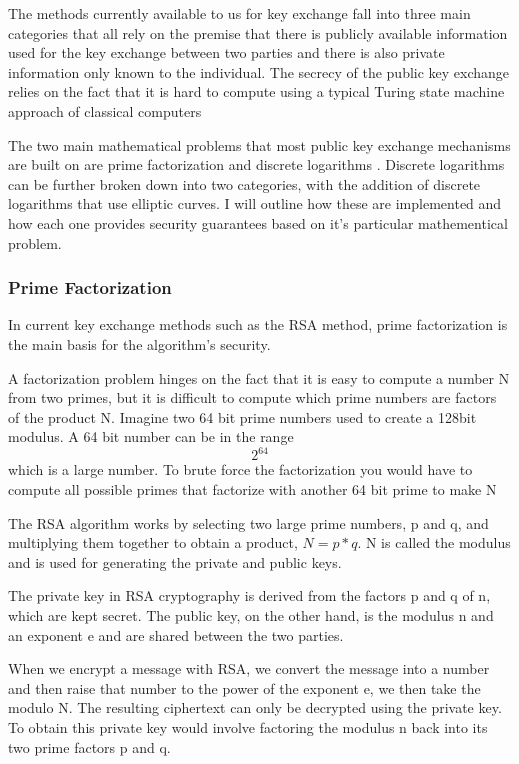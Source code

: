 \documentclass{article}
\begin{document}
The methods currently available to us for key exchange fall into three main categories that all rely on the premise that there is publicly available information used for the key exchange between two parties and there is also private information only known to the individual. The secrecy of the public key exchange relies on the fact  that it is hard to compute using a typical Turing state machine approach of classical computers 

The two main mathematical problems that most public key exchange mechanisms are built on are prime factorization and discrete logarithms \cite{AndersonR2020}. Discrete logarithms can be further broken down into two categories, with the addition of discrete logarithms that use elliptic curves. I will outline how these are implemented and how each one provides security guarantees based on it's particular mathementical problem.

\subsubsection{Prime Factorization}

In current key exchange methods such as the RSA method, prime factorization is the main basis for the algorithm's security. 

A factorization problem hinges on the fact that it is easy to compute a number N from two primes, but it is difficult to compute which prime numbers are factors of the product N. Imagine two 64 bit prime numbers used to create a 128bit modulus. A 64 bit number can be in the range \[2^{64}\] which is a large number. To brute force the factorization you would have to compute all possible primes that factorize with another 64 bit prime to make N

The RSA algorithm works by selecting two large prime numbers, p and q, and multiplying them together to obtain a product, $N = p*q$.  N is called the modulus and is used for generating the private and public keys. 

The private key in RSA cryptography is derived from the factors p and q of n, which are kept secret. The public key, on the other hand, is the modulus n and an exponent e and are shared between the two parties.

When we encrypt a message with RSA, we convert the message into a number and then raise that number to the power of the exponent e, we then take the modulo N. The resulting ciphertext can only be decrypted using the private key. To obtain this private key would  involve factoring the modulus n back into its two prime factors p and q.
\end{document}

